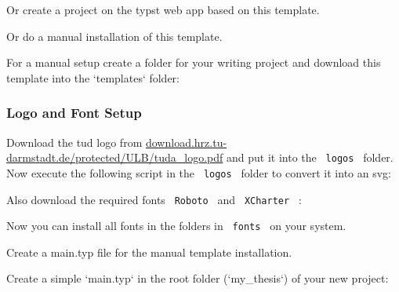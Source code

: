 Or create a project on the typst web app based on this template.

Or do a manual installation of this template.

For a manual setup create a folder for your writing project and download
this template into the `templates` folder:

\begin{Shaded}
\begin{Highlighting}[]
\KeywordTok{\&\&} 
\KeywordTok{\&\&} 
\end{Highlighting}
\end{Shaded}

\subsubsection{Logo and Font Setup}\label{logo-and-font-setup}

Download the tud logo from
\href{https://download.hrz.tu-darmstadt.de/protected/ULB/tuda_logo.pdf}{download.hrz.tu-darmstadt.de/protected/ULB/tuda\_logo.pdf}
and put it into the \texttt{\ logos\ } folder. Now execute the following
script in the \texttt{\ logos\ } folder to convert it into an svg:

\begin{Shaded}
\begin{Highlighting}[]
\end{Highlighting}
\end{Shaded}

Also download the required fonts \texttt{\ Roboto\ } and
\texttt{\ XCharter\ } :

\begin{Shaded}
\begin{Highlighting}[]
\end{Highlighting}
\end{Shaded}

Now you can install all fonts in the folders in \texttt{\ fonts\ } on
your system.

Create a main.typ file for the manual template installation.

Create a simple `main.typ` in the root folder (`my\_thesis`) of your new
project:

